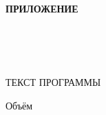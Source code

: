 \begin{ESKDtitlePage}
  \begin{flushright}
    \textbf{ПРИЛОЖЕНИЕ~\envPracticePrilLetter} \enspace\enspace
  \end{flushright}

  \begin{center}
    \envPracticeEducation\\
    \envPracticeUniversity\\
    \envPracticeFaculty\\
    \envPracticeCathedra
  \end{center}

  \vfill

  \begin{center}
    ТЕКСТ ПРОГРАММЫ
  \end{center}

  \vfill

  \begin{center}
    Объём~\envPracticeDiskSize \\
  \end{center}

  \vfill

  

  \vfill

  \begin{center}
    \envPracticeCity~\ESKDtheYear
  \end{center}
\end{ESKDtitlePage}
